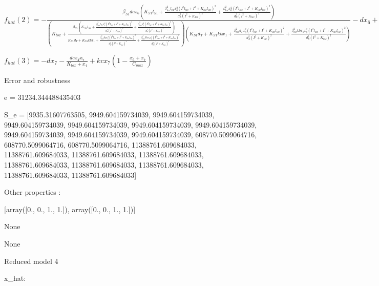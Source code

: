 $f_{hat}(2)=- \frac{\beta_{S1} dc x_{6} \left(K_{S1} l_{S1} + \frac{\beta_{lac}^{2} l_{S1} x_{6}^{2} \left(I^{2} l_{lac} + I^{2} + K_{lac} l_{lac}\right)^{2}}{d_{S}^{2} \left(I^{2} + K_{lac}\right)^{2}} + \frac{\beta_{lac}^{2} x_{6}^{2} \left(I^{2} l_{lac} + I^{2} + K_{lac} l_{lac}\right)^{2}}{d_{S}^{2} \left(I^{2} + K_{lac}\right)^{2}}\right)}{\left(K_{tox} + \frac{\beta_{S1} \left(K_{S1} l_{S1} + \frac{\beta_{lac}^{2} l_{S1} x_{6}^{2} \left(I^{2} l_{lac} + I^{2} + K_{lac} l_{lac}\right)^{2}}{d_{S}^{2} \left(I^{2} + K_{lac}\right)^{2}} + \frac{\beta_{lac}^{2} x_{6}^{2} \left(I^{2} l_{lac} + I^{2} + K_{lac} l_{lac}\right)^{2}}{d_{S}^{2} \left(I^{2} + K_{lac}\right)^{2}}\right)}{K_{S1} d_{T} + K_{S1} kb x_{1} + \frac{\beta_{lac}^{2} d_{T} x_{6}^{2} \left(I^{2} l_{lac} + I^{2} + K_{lac} l_{lac}\right)^{2}}{d_{S}^{2} \left(I^{2} + K_{lac}\right)^{2}} + \frac{\beta_{lac}^{2} kb x_{1} x_{6}^{2} \left(I^{2} l_{lac} + I^{2} + K_{lac} l_{lac}\right)^{2}}{d_{S}^{2} \left(I^{2} + K_{lac}\right)^{2}}}\right) \left(K_{S1} d_{T} + K_{S1} kb x_{1} + \frac{\beta_{lac}^{2} d_{T} x_{6}^{2} \left(I^{2} l_{lac} + I^{2} + K_{lac} l_{lac}\right)^{2}}{d_{S}^{2} \left(I^{2} + K_{lac}\right)^{2}} + \frac{\beta_{lac}^{2} kb x_{1} x_{6}^{2} \left(I^{2} l_{lac} + I^{2} + K_{lac} l_{lac}\right)^{2}}{d_{S}^{2} \left(I^{2} + K_{lac}\right)^{2}}\right)} - d x_{6} + kc x_{6} \left(1 - \frac{x_{6} + x_{7}}{C_{max}}\right)$


$f_{hat}(3)=- d x_{7} - \frac{dc x_{4} x_{7}}{K_{tox} + x_{4}} + kc x_{7} \left(1 - \frac{x_{6} + x_{7}}{C_{max}}\right)$



Error and robustness 


e = 31234.344488435403

S_e = [9935.31607763505, 9949.604159734039, 9949.604159734039, 9949.604159734039, 9949.604159734039, 9949.604159734039, 9949.604159734039, 9949.604159734039, 9949.604159734039, 9949.604159734039, 608770.5099064716, 608770.5099064716, 608770.5099064716, 11388761.609684033, 11388761.609684033, 11388761.609684033, 11388761.609684033, 11388761.609684033, 11388761.609684033, 11388761.609684033, 11388761.609684033, 11388761.609684033]

Other properties :


[array([0., 0., 1., 1.]), array([0., 0., 1., 1.])]

None

None

Reduced model 4

x_{hat}: 

